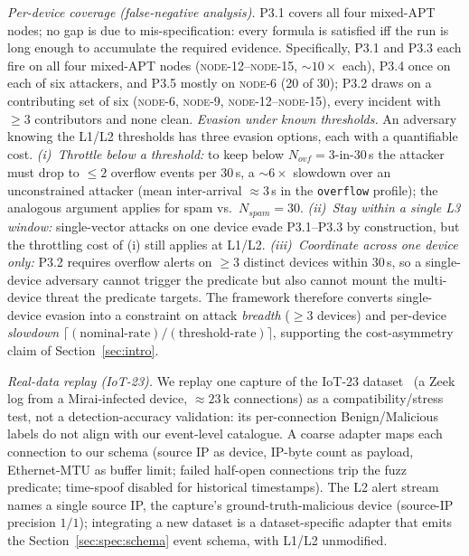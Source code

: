 \documentclass[runningheads]{llncs}
\begin{document}
\emph{Per-device coverage (false-negative analysis).}
P3.1 covers all four mixed-APT nodes; no gap is due to
mis-specification: every formula is satisfied iff the run is long
enough to accumulate the required evidence.  Specifically, P3.1 and
P3.3 each fire on all four mixed-APT nodes
(\textsc{node-12}--\textsc{node-15}, ${\sim}10\times$ each), P3.4 once
on each of six attackers, and P3.5 mostly on \textsc{node-6} (20 of
30); P3.2 draws on a contributing set of six (\textsc{node-6},
\textsc{node-9}, \textsc{node-12}--\textsc{node-15}), every incident
with $\geq 3$ contributors and none clean.
\emph{Evasion under known thresholds.}
An adversary knowing the L1/L2 thresholds has three evasion
options, each with a quantifiable cost.  \emph{(i)~Throttle
below a threshold:} to keep below $N_{\mathit{ovf}}{=}3$-in-30\,s
the attacker must drop to $\leq\!2$ overflow events per 30\,s,
a $\sim\!6\times$ slowdown over an unconstrained attacker (mean
inter-arrival $\approx 3$\,s in the \texttt{overflow} profile);
the analogous argument applies for spam vs.\ $N_{\mathit{spam}}{=}30$.
\emph{(ii)~Stay within a single L3 window:} single-vector attacks
on one device evade P3.1--P3.3 by construction, but the
throttling cost of (i) still applies at L1/L2.
\emph{(iii)~Coordinate across one device only:} P3.2 requires
overflow alerts on $\geq\!3$ distinct devices within 30\,s, so a
single-device adversary cannot trigger the predicate but also
cannot mount the multi-device threat the predicate targets.  The
framework therefore converts single-device evasion into a
constraint on attack \emph{breadth} ($\geq\!3$ devices) and
per-device \emph{slowdown} $\lceil
(\text{nominal-rate})/(\text{threshold-rate})\rceil$, supporting
the cost-asymmetry claim of Section~\ref{sec:intro}.

\label{sec:eval:iot23}
\emph{Real-data replay (IoT-23).}
We replay one capture of the IoT-23 dataset~\cite{iot23dataset}
(a Zeek log from a Mirai-infected device, ${\approx}23$\,k
connections) as a \mbox{compatibility/stress} test, not a
detection-accuracy validation: its per-connection Benign/Malicious
labels do not align with our event-level catalogue.  A coarse
adapter maps each connection to our schema (source IP as device,
IP-byte count as payload, Ethernet-MTU as buffer limit; failed
half-open connections trip the fuzz predicate; time-spoof disabled
for historical timestamps).  The L2 alert stream names a single
source IP, the capture's ground-truth-malicious device (source-IP
precision $1/1$); integrating a new dataset is a dataset-specific adapter
that emits the Section~\ref{sec:spec:schema} event schema, with L1/L2 unmodified.
\end{document}
